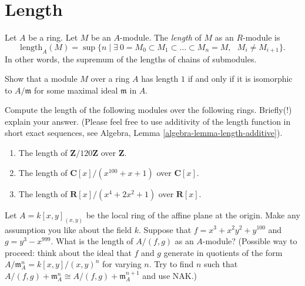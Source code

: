 \section{Length}
\label{section-length}

\begin{definition}
\label{definition-length}
Let $A$ be a ring. Let $M$ be an $A$-module. The
{\it length} of $M$ as an $R$-module is
$$
\text{length}_A(M)
=
\sup
\{
n
\mid
\exists\ 0 = M_0 \subset M_1 \subset \ldots \subset M_n = M,
\text{ }M_i \not = M_{i + 1}
\}.
$$
In other words, the supremum of the lengths of chains of submodules.
\end{definition}

\begin{exercise}
\label{exercise-length-is-one}
Show that a module $M$ over a ring $A$ has length $1$ if and only if
it is isomorphic to $A/\mathfrak m$ for some maximal ideal $\mathfrak m$
in $A$.
\end{exercise}

\begin{exercise}
\label{exercise-length-easy}
Compute the length of the following modules over the following rings.
Briefly(!) explain your answer. (Please feel free to use additivity of
the length function in short exact sequences, see
Algebra, Lemma \ref{algebra-lemma-length-additive}).
\begin{enumerate}
\item The length of $\mathbf{Z}/120\mathbf{Z}$ over $\mathbf{Z}$.
\item The length of $\mathbf{C}[x]/(x^{100} + x + 1)$ over $\mathbf{C}[x]$.
\item The length of $\mathbf{R}[x]/(x^4 + 2x^2 + 1)$ over $\mathbf{R}[x]$.
\end{enumerate}
\end{exercise}

\begin{exercise}
\label{exercise-compute-length}
Let $A = k[x, y]_{(x, y)}$ be the local ring of the affine plane at
the origin. Make any assumption you like about the field $k$. Suppose
that $f = x^3 + x^2y^2 + y^{100}$ and $g = y^3 - x^{999}$. What is the length
of $A/(f, g)$ as an $A$-module? (Possible way to proceed: think about the
ideal that $f$ and $g$ generate in quotients of the form $A/{\mathfrak m}_A^n=
k[x, y]/(x, y)^n$ for varying $n$. Try to find $n$ such that
$A/(f, g)+{\mathfrak m}_A^n \cong A/(f, g)+{\mathfrak m}_A^{n + 1}$
and use NAK.)
\end{exercise}






